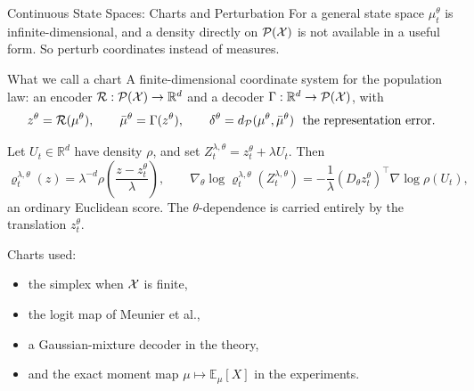 \documentclass[9pt]{beamer}
\def\Xc{{\cal X}}
\def\Pc{{\cal P}}
\def\Rc{{\cal R}}
\def\E{{\mathbb E}}
\def\R{{\mathbb R}}
\begin{document}
\begin{frame}{Continuous State Spaces: Charts and Perturbation}
\small
For a general state space $\mu_t^\theta$ is infinite-dimensional, and a density directly on $\Pc(\Xc)$ is not available in a useful form. So perturb coordinates instead of measures.

\begin{block}{What we call a chart}
A finite-dimensional coordinate system for the population law: an encoder $\Rc:\Pc(\Xc)\to\R^d$ and a decoder $\Gamma:\R^d\to\Pc(\Xc)$, with
\[
  z^\theta=\Rc(\mu^\theta),
  \qquad
  \bar\mu^\theta=\Gamma(z^\theta),
  \qquad
  \delta^\theta=d_\Pc(\mu^\theta,\bar\mu^\theta)\ \ \text{the representation error}.
\]
\end{block}

Let $U_t\in\R^d$ have density $\rho$, and set $Z_t^{\lambda,\theta}=z_t^\theta+\lambda U_t$. Then
\[
  \varrho_t^{\lambda,\theta}(z)
  =
  \lambda^{-d}\rho\!\left(\frac{z-z_t^\theta}{\lambda}\right),
  \qquad
  \nabla_\theta\log \varrho_t^{\lambda,\theta}(Z_t^{\lambda,\theta})
  =
  -\frac1\lambda (D_\theta z_t^\theta)^\top\nabla\log\rho(U_t),
\]
an ordinary Euclidean score. The $\theta$-dependence is carried entirely by the translation $z_t^\theta$.

\vspace{0.1cm}
Charts used:
\begin{itemize}
  \item the simplex when $\Xc$ is finite,
  \item the logit map of Meunier et al.,
  \item a Gaussian-mixture decoder in the theory,
  \item and the exact moment map $\mu\mapsto\E_\mu[X]$ in the experiments.
\end{itemize}
\end{frame}
\end{document}
